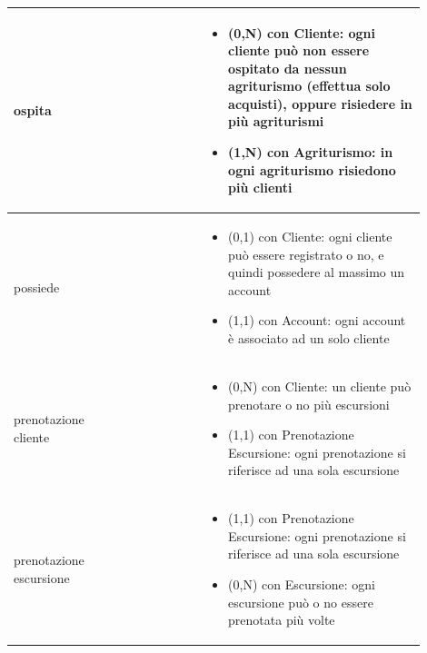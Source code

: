 \documentclass[12pt,a4paper]{article}
\begin{document}
\begin{center}
\begin{longtable}{|p{0.16\linewidth}|p{0.24\linewidth}|p{0.50\linewidth}|}
\hline
ospita 				& \begin{flushleft}\vspace{-15pt}  \end{flushleft}
					& \begin{itemize}
						\setlength{\itemindent}{-1em}
						\vspace{-25pt}
						\setlength\itemsep{-0.25em}
						\item (0,N) con Cliente: ogni cliente può non essere ospitato da nessun agriturismo (effettua solo acquisti), oppure risiedere in più agriturismi
						\item (1,N) con Agriturismo: in ogni agriturismo risiedono più clienti
					\end{itemize}\\ 

\hline
possiede 				& \begin{flushleft}\vspace{-15pt}  \end{flushleft}
					& \begin{itemize}
						\setlength{\itemindent}{-1em}
						\vspace{-25pt}
						\setlength\itemsep{-0.25em}
						\item (0,1) con Cliente: ogni cliente può essere registrato o no, e quindi possedere al massimo un account
						\item (1,1) con Account: ogni account è associato ad un solo cliente
					\end{itemize}\\ 

\hline
prenotazione cliente 				& \begin{flushleft}\vspace{-25pt}  \end{flushleft}
					& \begin{itemize}
						\setlength{\itemindent}{-1em}
						\vspace{-25pt}
						\setlength\itemsep{-0.25em}
						\item (0,N) con Cliente: un cliente può prenotare o no più escursioni
						\item (1,1) con Prenotazione Escursione: ogni prenotazione si riferisce ad una sola escursione
					\end{itemize}\\ 

\hline
prenotazione escursione 				& \begin{flushleft}\vspace{-25pt}  \end{flushleft}
					& \begin{itemize}
						\setlength{\itemindent}{-1em}
						\vspace{-25pt}
						\setlength\itemsep{-0.25em}
						\item (1,1) con Prenotazione Escursione: ogni prenotazione si riferisce ad una sola escursione
						\item (0,N) con Escursione: ogni escursione può o no essere prenotata più volte
					\end{itemize}\\ 


\end{longtable}
\end{center}
\end{document}
